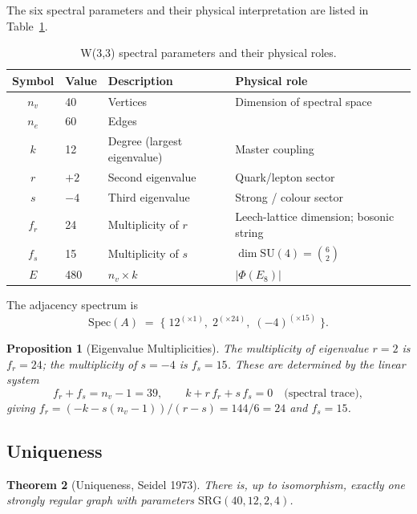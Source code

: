\documentclass[12pt,a4paper]{article}
\newtheorem{theorem}{Theorem}[section]
\newtheorem{proposition}[theorem]{Proposition}
\newcommand{\SRG}{\mathrm{SRG}}
\newcommand{\Eone}{E_8}
\newcommand{\nv}{n_{\!v}}
\renewcommand{\ne}{n_{\!e}}
\newcommand{\fr}{f_{\!r}}
\newcommand{\fs}{f_{\!s}}
\begin{document}
The six spectral parameters and their physical interpretation are
listed in Table~\ref{tab:params}.

\begin{table}[H]
\centering
\caption{W(3,3) spectral parameters and their physical roles.}
\label{tab:params}
\renewcommand{\arraystretch}{1.25}
\begin{tabular}{@{}clll@{}}
\toprule
Symbol & Value & Description & Physical role \\
\midrule
$\nv$ & 40 & Vertices & Dimension of spectral space \\
$\ne$ & 60 & Edges & \\
$k$ & 12 & Degree (largest eigenvalue) & Master coupling \\
$r$ & $+2$ & Second eigenvalue & Quark/lepton sector \\
$s$ & $-4$ & Third eigenvalue & Strong / colour sector \\
$\fr$ & 24 & Multiplicity of $r$ & Leech-lattice dimension; bosonic string \\
$\fs$ & 15 & Multiplicity of $s$ & $\dim\mathrm{SU}(4)=\binom{6}{2}$ \\
$E$ & 480 & $\nv\times k$ & $|\Phi(\Eone)|$ \\
\bottomrule
\end{tabular}
\end{table}

The adjacency spectrum is
\[
  \mathrm{Spec}(A) \;=\;
  \bigl\{\; 12^{(\times 1)},\; 2^{(\times 24)},\; (-4)^{(\times 15)} \;\bigr\}.
\]

\begin{proposition}[Eigenvalue Multiplicities]
\label{prop:multiplicities}
The multiplicity of eigenvalue $r=2$ is $\fr = 24$; the multiplicity of
$s=-4$ is $\fs = 15$.  These are determined by the linear system
\[
  \fr + \fs = \nv - 1 = 39, \qquad
  k + r\,\fr + s\,\fs = 0 \quad \text{(spectral trace)},
\]
giving $\fr = (-k - s(\nv-1))/(r-s) = 144/6 = 24$ and $\fs = 15$.
\end{proposition}

\subsection{Uniqueness}

\begin{theorem}[Uniqueness, Seidel 1973]
There is, up to isomorphism, exactly one strongly regular graph with
parameters $\SRG(40,12,2,4)$. \cite{Seidel1973}
\end{theorem}
\end{document}
